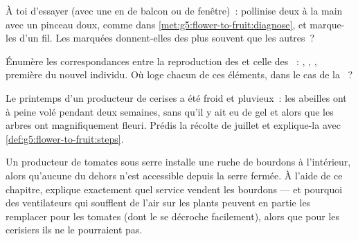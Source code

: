 \begin{exercise}[$\star$]\label{exo:g5:flower-to-fruit:8}
À toi d'essayer (avec une  en  de balcon ou de fenêtre)~:
pollinise deux  à la main avec un pinceau doux, comme dans
\cref{met:g5:flower-to-fruit:diagnose}, et marque-les d'un fil. Les
 marquées donnent-elles des  plus souvent que les
autres~?
\end{exercise}

\begin{exercise}[$\star\star$]\label{exo:g5:flower-to-fruit:9}
Énumère les correspondances entre la reproduction des  et
celle des ~: , , ,
première  du nouvel individu. Où loge chacun de ces éléments,
dans le cas de la ~?
\end{exercise}

\begin{exercise}[$\star\star$]\label{exo:g5:flower-to-fruit:10}
Le printemps d'un producteur de cerises a été froid et pluvieux~:
les abeilles ont à peine volé pendant deux semaines, sans qu'il y
ait eu de gel et alors que les arbres ont magnifiquement fleuri.
Prédis la récolte de juillet et explique-la avec
\cref{def:g5:flower-to-fruit:steps}.
\end{exercise}

\begin{exercise}[$\star\star\star$]\label{exo:g5:flower-to-fruit:11}
Un producteur de tomates sous serre installe une ruche de bourdons à
l'intérieur, alors qu'aucune  du dehors n'est accessible depuis
la serre fermée. À l'aide de ce chapitre, explique exactement quel
service vendent les bourdons --- et pourquoi des ventilateurs qui
soufflent de l'air sur les plants peuvent en partie les remplacer
pour les tomates (dont le  se décroche facilement), alors que
pour les cerisiers ils ne le pourraient pas.
\end{exercise}

